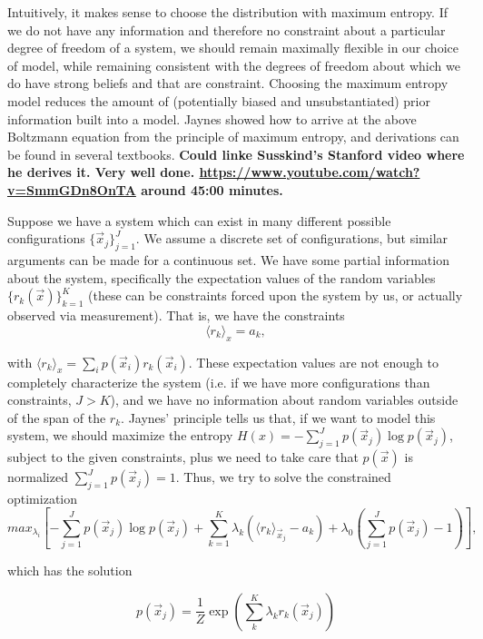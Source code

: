 \documentclass[nofootinbib, superscriptaddress, prl]{revtex4}
\begin{document}
Intuitively, it makes sense to choose the distribution with maximum entropy. If we do not have any information and therefore no constraint about a particular degree of freedom of a system, we should remain maximally flexible in our choice of model, while remaining consistent with the degrees of freedom about which we do have strong beliefs and that are constraint. Choosing the maximum entropy model reduces the amount of (potentially biased and unsubstantiated) prior information built into a model. Jaynes showed how to arrive at the above Boltzmann equation from the principle of maximum entropy, and derivations can be found in several textbooks. \textbf{Could linke Susskind's Stanford video where he derives it. Very well done. \url{https://www.youtube.com/watch?v=SmmGDn8OnTA} around 45:00 minutes.}

Suppose we have a system which can exist in many different possible configurations $\{\vec{x}_j\}_{j=1}^J$. We assume a discrete set of configurations, but similar arguments can be made for a continuous set. We have some partial information about the system, specifically the expectation values of the random variables $\{r_k(\vec{x})\}_{k=1}^K$ (these can be constraints forced upon the system by us, or actually observed via measurement). That is, we have the constraints 
\begin{equation}
 \langle r_k \rangle_{x} = a_k,
\end{equation}

with $ \langle r_k \rangle_{x} = \sum_i p(\vec{x}_i) r_k(\vec{x}_i)$.
These expectation values are not enough to completely characterize the system (i.e. if we have more configurations than constraints, $J>K$), and we have no information about random variables outside of the span of the $r_k$. Jaynes' principle tells us that, if we want to model this system, we should maximize the entropy $H(x) = -\sum_{j=1}^J p(\vec{x}_j) \log p(\vec{x}_j)$, subject to the given constraints, plus we need to take care that $p(\vec{x})$ is normalized $\sum_{j=1}^J p(\vec{x}_j) = 1 $. Thus, we try to solve the constrained optimization
\begin{equation}
 \textit{max}_{\lambda_i}[-\sum_{j=1}^J p(\vec{x}_j) \log p(\vec{x}_j) + \sum_{k=1}^K \lambda_k (\langle r_k \rangle_{\vec{x}_j} - a_k) + \lambda_0(\sum_{j=1}^J p(\vec{x}_j) - 1)],
\end{equation}

which has the solution

\begin{equation}
p(\vec{x}_j) = \frac{1}{Z} \exp \left( \sum_k^K \lambda_k  r_k (\vec{x}_j)\right)
\end{equation}
\end{document}
